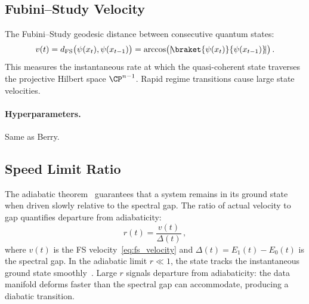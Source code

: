 

\subsection{Fubini--Study Velocity}\label{subsec:velocity}

The Fubini--Study geodesic distance between consecutive quantum states:
\begin{equation}\label{eq:fs_velocity}
  v(t) = d_{\mathrm{FS}}\bigl(\psi(x_t), \psi(x_{t-1})\bigr)
       = \arccos\bigl(|\!\braket{\psi(x_t)}{\psi(x_{t-1})}\!|\bigr)\,.
\end{equation}
This measures the instantaneous rate at which the quasi-coherent state
traverses the projective Hilbert space $\CP^{n-1}$.  Rapid regime
transitions cause large state velocities.

\paragraph{Hyperparameters.}  Same as Berry.

\subsection{Speed Limit Ratio}\label{subsec:speed_limit}

The adiabatic theorem~\cite{kato1966} guarantees that a system
remains in its ground state when driven slowly relative to the spectral
gap.  The ratio of actual velocity to gap quantifies departure from
adiabaticity:
\begin{equation}\label{eq:speed_limit}
  r(t) = \frac{v(t)}{\Delta(t)}\,,
\end{equation}
where $v(t)$ is the FS velocity~\eqref{eq:fs_velocity} and
$\Delta(t) = E_1(t) - E_0(t)$ is the spectral gap.  In the adiabatic
limit $r \ll 1$, the state tracks the instantaneous ground state
smoothly~\cite{born_fock1928,kato1966}.  Large $r$ signals departure
from adiabaticity: the data manifold deforms faster than the spectral
gap can accommodate, producing a diabatic transition.

